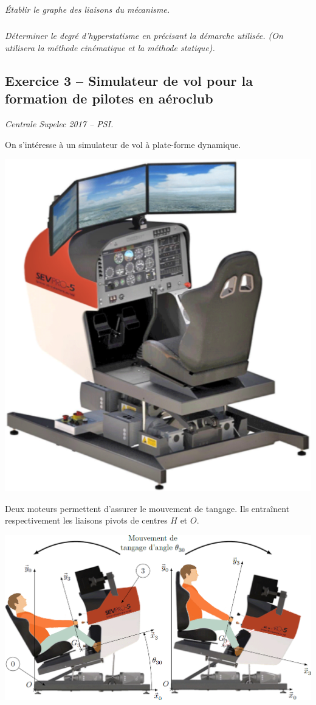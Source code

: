 \documentclass[10pt,fleqn]{article} %
\begin{document}
\begin{multicols}{2}
\subparagraph{}
\textit{Établir le graphe des liaisons du mécanisme.}
\ifprof
\begin{corrige}
\end{corrige}\else\fi

\subparagraph{}
\textit{Déterminer le degré d'hyperstatisme en précisant la démarche utilisée. (On utilisera la méthode cinématique et la méthode statique).}
\ifprof
\begin{corrige}
\end{corrige}\else\fi

\subsection*{Exercice 3 -- Simulateur de vol pour la formation de pilotes en aéroclub}
\setcounter{exo}{0}
\begin{flushright}
\textit{Centrale Supelec 2017 -- PSI.}
\end{flushright}
On s’intéresse à un simulateur de vol à plate-forme dynamique. 

\begin{center}
\includegraphics[width=.7\linewidth]{images/aero_01.png}
\end{center}

Deux moteurs permettent d'assurer le mouvement de tangage.  Ils entraînent respectivement les liaisons pivots de centres $H$ et $O$. 

\begin{center}
\includegraphics[width=\linewidth]{images/aero_04.png}
\end{center}


\end{multicols}
\end{document}
